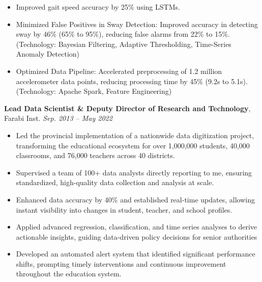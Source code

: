 \documentclass[a4paper,10pt]{article}
\begin{document}
\begin{itemize}

    \item Improved gait speed accuracy by 25\% using LSTMs.
    
    \item Minimized False Positives in Sway Detection: Improved accuracy in detecting sway by 46\% (65\% to 95\%), reducing false alarms from 22\% to 15\%. (Technology: Bayesian Filtering, Adaptive Thresholding, Time-Series Anomaly Detection)
    
    \item Optimized Data Pipeline: Accelerated preprocessing of 1.2 million accelerometer data points, reducing processing time by 45\% (9.2s to 5.1s). (Technology: Apache Spark, Feature Engineering)

\end{itemize}

\vspace{6pt}
\hspace{3mm} \textbf{Lead Data Scientist \& Deputy Director of Research and Technology}, Farabi Inst. \hfill \textit{Sep. 2013 -- May 2022}

\begin{itemize}
    
    \item Led the provincial implementation of a nationwide data digitization project, transforming the educational ecosystem for over 1,000,000 students, 40,000 classrooms, and 76,000 teachers across 40 districts.
   
    \item Supervised a team of 100+ data analysts directly reporting to me, ensuring standardized, high-quality data collection and analysis at scale.
    
    \item Enhanced data accuracy by 40\% and established real-time updates, allowing instant visibility into changes in student, teacher, and school profiles.
    
    \item Applied advanced regression, classification, and time series analyses to derive actionable insights, guiding data-driven policy decisions for senior authorities
    
    \item Developed an automated alert system that identified significant performance shifts, prompting timely interventions and continuous improvement throughout the education system.
    
\end{itemize}
\end{document}
